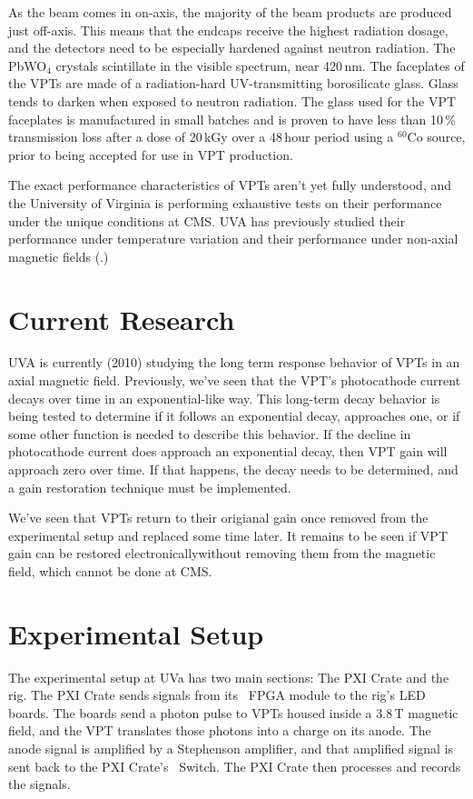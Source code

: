 As the beam comes in on-axis, the majority of the beam products are produced just off-axis.  This means that the endcaps receive the highest radiation dosage, and the detectors need to be especially hardened against neutron radiation.  The PbWO$_4$ crystals scintillate in the visible spectrum, near 420\,nm.   The faceplates of the VPTs are made of a radiation-hard UV-transmitting borosilicate glass.  Glass tends to darken when exposed to neutron radiation.  The glass used for the VPT faceplates is manufactured in small batches and is proven to have less than 10\,\% transmission loss after a dose of 20\,kGy over a 48\,hour period using a $^{60}$Co source, prior to being accepted for use in VPT production.

The exact performance characteristics of VPTs aren't yet fully understood, and the University of Virginia is performing exhaustive tests on their performance under the unique conditions at CMS.  UVA has previously studied their performance under temperature variation and their performance under non-axial magnetic fields (.)

\section{Current Research}
UVA is currently (2010) studying the long term response behavior of VPTs in an axial magnetic field.  Previously, we've seen that the VPT's photocathode current decays over time in an exponential-like way.  This long-term decay behavior is being tested to determine if it follows an exponential decay, approaches one, or if some other function is needed to describe this behavior.  If the decline in photocathode current does approach an exponential decay, then VPT gain will approach zero over time.  If that happens, the decay needs to be determined, and a gain restoration technique must be implemented.

We've seen that VPTs return to their origianal gain once removed from the experimental setup and replaced some time later.  It remains to be seen if VPT gain can be restored electronically\dashem{}without removing them from the magnetic field, which cannot be done at CMS.

\section{Experimental Setup}
\label{sec:eq_intro:setup}

The experimental setup at UVa has two main sections: The \Gls{PXI Crate} and the \Gls{rig}.  The \gls{PXI Crate} sends signals from its \pxislottwo{}~\gls{FPGA} module to the rig's \glspl{LED board}.  The boards send a photon pulse to VPTs housed inside a 3.8\,T magnetic field, and the VPT translates those photons into a charge on its anode.  The anode signal is amplified by a Stephenson amplifier, and that amplified signal is sent back to the PXI Crate's ~Switch.  The PXI Crate then processes and records the signals.

